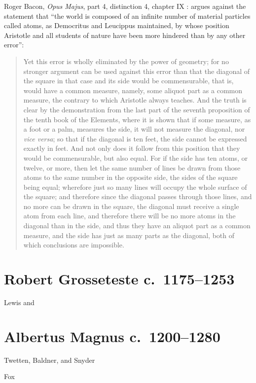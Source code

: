 \documentclass{article}
\begin{document}
Roger Bacon, {\em Opus Majus}, part 4, distinction 4, chapter IX \cite[p.~173]{baconI}: argues against the statement that ``the world is composed of an infinite number of material
particles called atoms, as Democritus and Leucippus maintained, by whose position Aristotle and all students of nature have been more hindered than by any other error'': 

\begin{quote}
Yet this error is wholly eliminated by the power
of geometry; for no stronger argument can be used against this error than that the diagonal of the square
in that case and its side would be commensurable, that is, would have a common measure, namely, some aliquot part as a common
measure, the contrary to which Aristotle always teaches. And the truth is clear by the demonstration from the last part of the seventh proposition of the tenth book of the
Elements, where it is shown that if some measure, as a foot or a palm, measures the side, it will not measure the diagonal, nor {\em vice versa}; so that if the diagonal
is ten feet, the side cannot be expressed exactly in feet. And not only does it follow
from this position that they would be commensurable, but also equal. For if the side has ten atoms, or twelve, or more, then let the same number of lines
be drawn from those atoms to the same number in the opposite side, the sides of the square being equal; wherefore just so many lines will occupy the whole
surface of the square; and therefore since the diagonal passes through those lines, and no more can be drawn in the square, the diagonal must receive a single atom from each
line, and therefore there will be no more atoms in the diagonal than in the side, and thus they have an aliquot part as a common measure, and the side has just as many parts
as the diagonal, both of which conclusions are impossible.
\end{quote}


\section{Robert Grosseteste c.~1175--1253}
Lewis \cite{lewis2005} and \cite{lewis2012}



\section{Albertus Magnus c.~1200--1280}
Twetten, Baldner, and Snyder \cite{snyder}

Fox \cite{fox}
\end{document}
